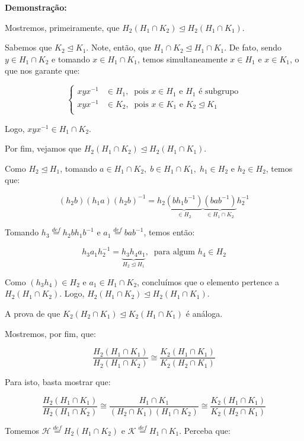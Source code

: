 \documentclass[16pt,openany]{book}
\theoremstyle{definition}
\begin{document}
{\color{red}

\textbf{Demonstração:}

Mostremos, primeiramente, que $H_2(H_1 \cap K_2) \trianglelefteq H_2(H_1 \cap K_1)$.

Sabemos que $K_2 \trianglelefteq K_1$. Note, então, que $H_1 \cap K_2 \trianglelefteq H_1 \cap K_1$. De fato, sendo $y\in H_1 \cap K_2$ e tomando $x \in H_1 \cap K_1$, temos simultaneamente $x \in H_1$ e $x \in K_1$, o que nos garante que:

\[
\left\{
\begin{aligned}
xyx^{-1} &\in H_1,\;\; \text{pois } x\in H_1 \text{ e } H_1 \text{ é subgrupo} \\
xyx^{-1} &\in K_2, \;\; \text{pois } x\in K_1 \text{ e } K_2 \trianglelefteq K_1 \\
\end{aligned}
\right.
\]

Logo, $xyx^{-1} \in H_1 \cap K_2$.

Por fim, vejamos que $H_2(H_1 \cap K_2) \trianglelefteq H_2(H_1 \cap K_1)$.

Como $H_2 \trianglelefteq H_1$, tomando $a\in H_1\cap K_2,\; b\in H_1\cap K_1,\; h_1 \in H_2$ e $h_2\in H_2$, temos que:

\[
(h_2b)(h_1a)(h_2b)^{-1} = h_2\underbrace{(b h_1 b^{-1})}_{\in H_2}\underbrace{(b a b^{-1})}_{\in H_1\cap K_2}h_2^{-1}
\] 

Tomando $h_3 \overset{def}{=} h_2bh_1b^{-1}$ e $a_1 \overset{def}{=} bab^{-1}$, temos então:

\[
h_3a_1 h_2^{-1} = \underbrace{h_3h_4a_1}_{H_2 \trianglelefteq H_1},\;\; \text{para algum } h_4\in H_2
\]

Como $(h_3h_4) \in H_2$ e $a_1 \in H_1 \cap K_2$, concluímos que o elemento pertence a $H_2(H_1 \cap K_2)$. 
Logo, $H_2(H_1 \cap K_2) \trianglelefteq H_2(H_1 \cap K_1)$. 

A prova de que $K_2(H_2\cap K_1) \trianglelefteq K_2(H_1\cap K_1)$ é análoga.

Mostremos, por fim, que:

\[
\frac{H_2(H_1 \cap K_1)}{H_2(H_1 \cap K_2)} \cong \frac{K_2(H_1\cap K_1)}{K_2(H_2\cap K_1)}
\]

Para isto, basta mostrar que:

\[
\frac{H_2(H_1 \cap K_1)}{H_2(H_1 \cap K_2)} \cong \frac{H_1\cap K_1}{(H_2\cap K_1)(H_1\cap K_2)} \cong \frac{K_2(H_1\cap K_1)}{K_2(H_2\cap K_1)}
\]

Tomemos $\mathcal{H} \overset{def}{=} H_2(H_1\cap K_2)$ e $\mathcal{K} \overset{def}{=} H_1\cap K_1$. Perceba que:

}
\end{document}
